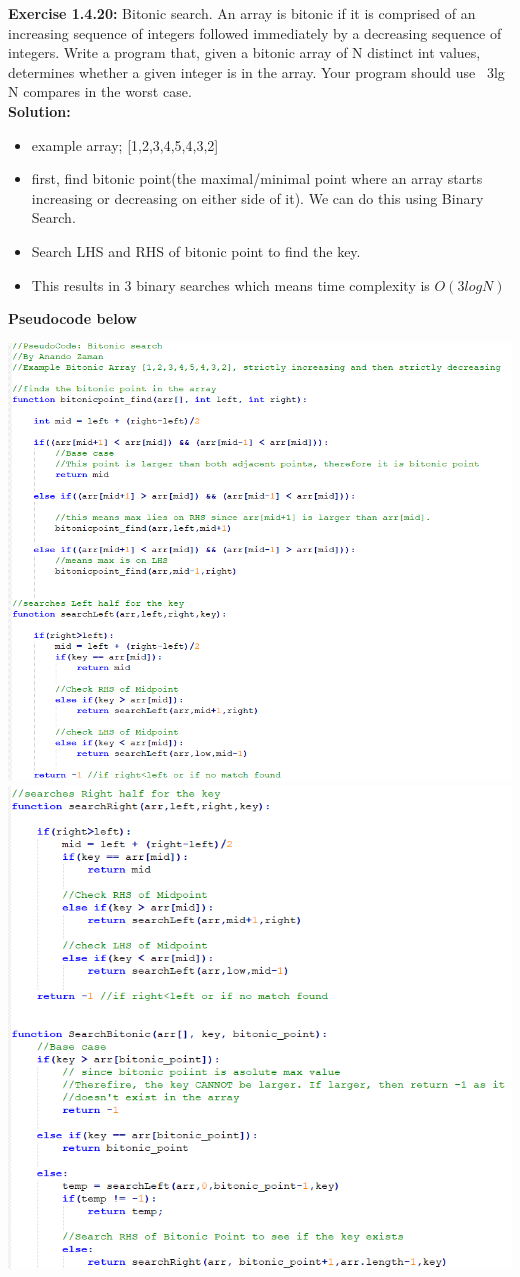 \documentclass[11pt,fleqn]{article}
\begin{document}
\textbf{Exercise 1.4.20:} Bitonic search. An array is bitonic if it is comprised of an increasing sequence
of integers followed immediately by a decreasing sequence of integers. Write a program
that, given a bitonic array of N distinct int values, determines whether a given integer
is in the array. Your program should use ~3lg N compares in the worst case.\\

\textbf{Solution:}
\begin{itemize}
	\item example array; [1,2,3,4,5,4,3,2]
	\item first, find bitonic point(the maximal/minimal point where an array starts increasing or decreasing on either side of it). We can do this using Binary Search.
	\item Search LHS and RHS of bitonic point to find the key.
	\item This results in 3 binary searches which means time complexity is $O(3logN)$
\end{itemize}

\newpage
\textbf{Pseudocode below}
\begin{center}
	\includegraphics[scale = 1]{1.4.20.png}
	\includegraphics[scale = 1]{1.4.20-1.png}
	\end{center}
\end{document}
